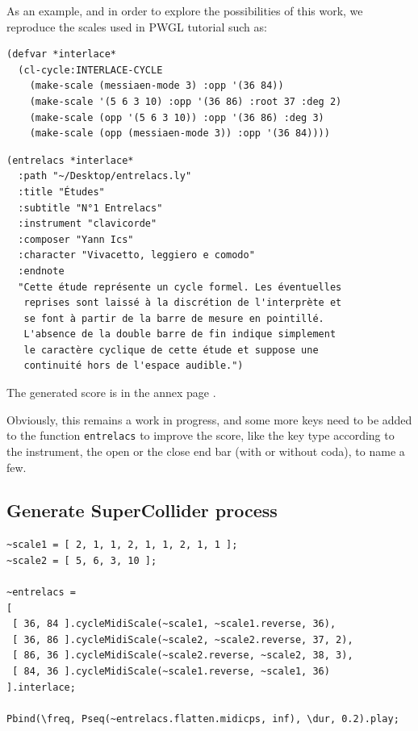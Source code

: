 \bigskip

As an example, and in order to explore the possibilities of this work, we reproduce the scales used in PWGL tutorial such as:

\begin{lstlisting}
(defvar *interlace*
  (cl-cycle:INTERLACE-CYCLE 
    (make-scale (messiaen-mode 3) :opp '(36 84))
    (make-scale '(5 6 3 10) :opp '(36 86) :root 37 :deg 2)
    (make-scale (opp '(5 6 3 10)) :opp '(36 86) :deg 3)
    (make-scale (opp (messiaen-mode 3)) :opp '(36 84))))
\end{lstlisting}
  
\begin{lstlisting}  
(entrelacs *interlace*
  :path "~/Desktop/entrelacs.ly"
  :title "Études"
  :subtitle "N°1 Entrelacs"
  :instrument "clavicorde"
  :composer "Yann Ics"
  :character "Vivacetto, leggiero e comodo"
  :endnote 
  "Cette étude représente un cycle formel. Les éventuelles 
   reprises sont laissé à la discrétion de l'interprète et 
   se font à partir de la barre de mesure en pointillé. 
   L'absence de la double barre de fin indique simplement
   le caractère cyclique de cette étude et suppose une 
   continuité hors de l'espace audible.")
\end{lstlisting}

\noindent The generated score is in the annex page \pageref{clav}.

\bigskip

Obviously, this remains a work in progress, and some more keys need to be added to the function \texttt{entrelacs} to improve the score, like the key type according to the instrument, the open or the close end bar (with or without coda), to name a few.

\subsection*{Generate SuperCollider process}

\begin{lstlisting}
~scale1 = [ 2, 1, 1, 2, 1, 1, 2, 1, 1 ];
~scale2 = [ 5, 6, 3, 10 ];

~entrelacs =
[
 [ 36, 84 ].cycleMidiScale(~scale1, ~scale1.reverse, 36),
 [ 36, 86 ].cycleMidiScale(~scale2, ~scale2.reverse, 37, 2),
 [ 86, 36 ].cycleMidiScale(~scale2.reverse, ~scale2, 38, 3),
 [ 84, 36 ].cycleMidiScale(~scale1.reverse, ~scale1, 36)
].interlace;

Pbind(\freq, Pseq(~entrelacs.flatten.midicps, inf), \dur, 0.2).play;
\end{lstlisting}

